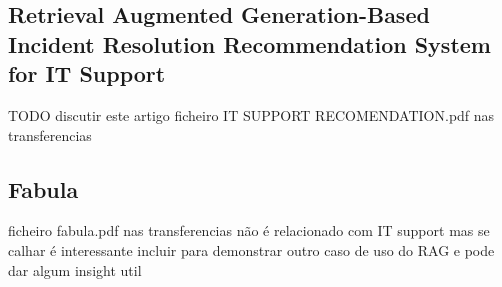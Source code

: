 \subsection{Retrieval Augmented Generation-Based Incident Resolution Recommendation System for IT Support} 

TODO discutir este artigo
ficheiro IT SUPPORT RECOMENDATION.pdf nas transferencias


\subsection{Fabula}

ficheiro fabula.pdf nas transferencias
não é relacionado com IT support mas se calhar é interessante incluir para demonstrar outro caso de uso do RAG e pode dar algum insight util



